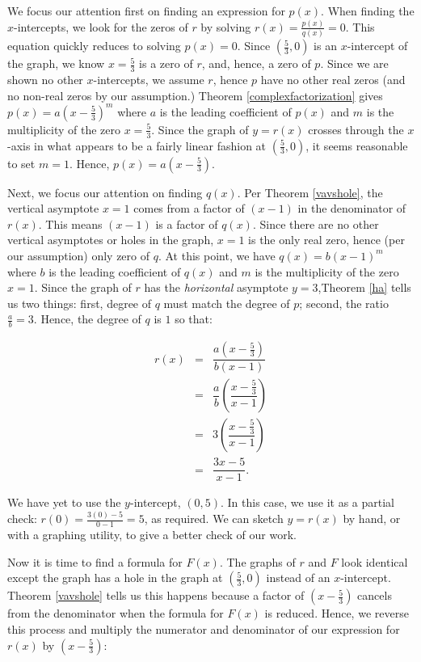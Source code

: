 \documentclass{ximera}
\begin{document}
\begin{ex}
We focus our attention first on finding an expression for $p(x)$.  When finding the $x$-intercepts, we look for the zeros of $r$ by solving $r(x) = \frac{p(x)}{q(x)} = 0$.  This equation quickly reduces to solving $p(x) =0$.  Since  $\left(\frac{5}{3}, 0 \right)$ is an $x$-intercept of the graph, we know $x = \frac{5}{3}$ is a zero of $r$, and, hence, a zero of $p$.  Since we are shown no other $x$-intercepts, we assume $r$, hence $p$ have no other real zeros (and no non-real zeros by our assumption.)  Theorem \ref{complexfactorization}  gives  $p(x) = a\left(x - \frac{5}{3}\right)^m$ where $a$ is the leading coefficient of $p(x)$ and $m$ is the multiplicity of the zero $x = \frac{5}{3}$.  Since the graph of $y = r(x)$ crosses through the $x$-axis in what appears to be a fairly linear fashion at  $\left(\frac{5}{3}, 0 \right)$, it seems reasonable to set $m=1$.  Hence, $p(x) = a \left(x - \frac{5}{3}\right)$.

Next, we focus our attention on finding $q(x)$.  Per Theorem \ref{vavshole}, the vertical asymptote  $x=1$ comes from a factor of $(x-1)$ in the denominator of $r(x)$.  This means $(x-1)$ is a factor of $q(x)$.  Since there are no other vertical asymptotes or holes in the graph, $x=1$ is the only real zero, hence (per our assumption) only zero of $q$.  At this point, we have $q(x) = b(x-1)^m$ where $b$ is the leading coefficient of $q(x)$ and $m$ is the multiplicity of the zero $x=1$.  Since the graph of  $r$ has the \textit{horizontal} asymptote $y = 3$,Theorem \ref{ha} tells us two  things:  first,  degree of $q$ must match the degree of $p$; second, the ratio $\frac{a}{b} = 3$.   Hence, the degree of $q$ is $1$ so that: 

\[ \begin{array}{rcl}

r(x) & = & \dfrac{a \left(x - \frac{5}{3}\right)}{b(x-1)} \\
       & = & \dfrac{a}{b} \left(\dfrac{x - \frac{5}{3}}{x-1}\right) \\
        & = & 3  \left(\dfrac{x - \frac{5}{3}}{x-1}\right) \\
        & = & \dfrac{3x-5}{x-1}. \end{array} \]

We have yet to use the $y$-intercept, $(0,5)$.  In this case, we use it as a partial check:  $r(0) = \frac{3(0)-5}{0-1} = 5$, as required.  We can sketch $y=r(x)$ by hand, or with a graphing utility, to give a better check of our work.

Now it is time to find a formula for $F(x)$.  The graphs of $r$ and $F$ look identical except the graph has a hole in the graph at $\left(\frac{5}{3}, 0 \right)$ instead of an $x$-intercept.  Theorem \ref{vavshole} tells us this happens because a factor of $\left(x - \frac{5}{3} \right)$ cancels from the denominator when the formula for $F(x)$ is reduced.  Hence, we reverse this process and multiply the numerator and denominator of our expression for $r(x)$ by $\left(x - \frac{5}{3} \right)$:


\end{ex}
\end{document}
